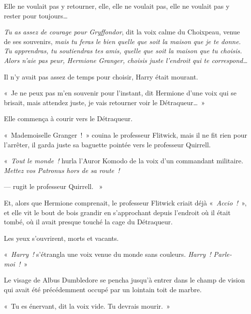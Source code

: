 Elle ne voulait pas y retourner, elle, elle ne voulait pas, elle ne voulait pas y rester pour toujours…

\emph{Tu as assez de courage pour Gryffondor}, dit la voix calme du Choixpeau, venue de ses souvenirs, \emph{mais tu feras le bien quelle que soit la maison que je te donne. Tu apprendras, tu soutiendras tes amis, quelle que soit la maison que tu choisis. Alors n'aie pas peur, Hermione Granger, choisis juste l'endroit qui te correspond…}

Il n'y avait pas assez de temps pour choisir, Harry était mourant.

«~Je ne peux pas m'en souvenir pour l'instant, dit Hermione d'une voix qui se brisait, mais attendez juste, je vais retourner voir le Détraqueur…~»

Elle commença à courir vers le Détraqueur.

«~Mademoiselle Granger~!~» couina le professeur Flitwick, mais il ne fit rien pour l'arrêter, il garda juste sa baguette pointée vers le professeur Quirrell.

«~\emph{Tout le monde~!} hurla l'Auror Komodo de la voix d'un commandant militaire. \emph{Mettez vos Patronus hors de sa route~!}

---  rugit le professeur Quirrell. ~»

Et, alors que Hermione comprenait, le professeur Flitwick criait déjà «~\emph{Accio~!}~», et elle vit le bout de bois grandir en s'approchant depuis l'endroit où il était tombé, où il avait presque touché la cage du Détraqueur.

\later

Les yeux s'ouvrirent, morts et vacants.

«~\emph{Harry~!} s'étrangla une voix venue du monde sans couleurs. \emph{Harry~! Parle-moi~!}~»

Le visage de Albus Dumbledore se pencha jusqu'à entrer dans le champ de vision qui avait été précédemment occupé par un lointain toit de marbre.

«~Tu es énervant, dit la voix vide. Tu devrais mourir.~»

